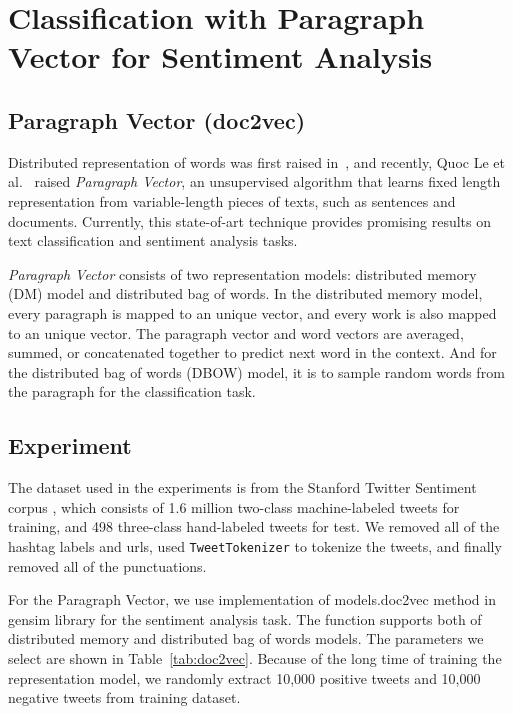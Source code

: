 \section{Classification with Paragraph Vector for Sentiment Analysis}

\subsection{Paragraph Vector (doc2vec)}
Distributed representation of words was first raised in~\cite{rumelhart1988}, and recently, Quoc Le et al.~\cite{le2014} raised {\textit{Paragraph Vector}}, an unsupervised algorithm that learns fixed length representation from variable-length pieces of texts, such as sentences and documents. Currently, this state-of-art technique provides promising results on text classification and sentiment analysis tasks.

{\textit{Paragraph Vector}} consists of two representation models: distributed memory (DM) model and distributed bag of words. In the distributed memory model, every paragraph is mapped to an unique vector, and every work is also mapped to an unique vector. The paragraph vector and word vectors are averaged, summed, or concatenated together to predict next word in the context. And for the distributed bag of words (DBOW) model, it is to sample random words from the paragraph for the classification task.


\subsection{Experiment}
The dataset used in the experiments is from the Stanford Twitter Sentiment corpus \cite{go2009}, which consists of 1.6 million two-class machine-labeled tweets for training, and 498 three-class hand-labeled tweets for test. We removed all of the hashtag labels and urls, used {\tt TweetTokenizer} to tokenize the tweets, and finally removed all of the punctuations. 

For the Paragraph Vector, we use implementation of models.doc2vec method in gensim library for the sentiment analysis task. The function supports both of distributed memory and distributed bag of words models. The parameters we select are shown in Table~\ref{tab:doc2vec}. Because of the long time of training the representation model, we randomly extract 10,000 positive tweets and 10,000 negative tweets from training dataset.

